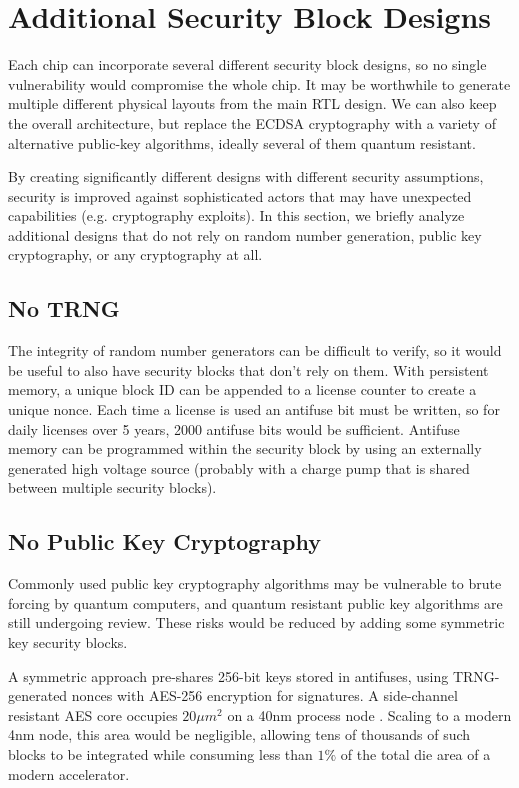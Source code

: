 \documentclass{article}
\begin{document}
\section{Additional Security Block Designs}
\label{sec:alternative_designs}

Each chip can incorporate several different security block designs, so no single vulnerability would compromise the whole chip. It may be worthwhile to generate multiple different physical layouts from the main RTL design. We can also keep the overall architecture, but replace the ECDSA cryptography with a variety of alternative public-key algorithms, ideally several of them quantum resistant.

By creating significantly different designs with different security assumptions, security is improved against sophisticated actors that may have unexpected capabilities (e.g. cryptography exploits). In this section, we briefly analyze additional designs that do not rely on random number generation, public key cryptography, or any cryptography at all.


\subsection{No TRNG}

The integrity of random number generators can be difficult to verify, so it would be useful to also have security blocks that don't rely on them. With persistent memory, a unique block ID can be appended to a license counter to create a unique nonce. Each time a license is used an antifuse bit must be written, so for daily licenses over 5 years, 2000 antifuse bits would be sufficient. Antifuse memory can be programmed within the security block by using an externally generated high voltage source (probably with a charge pump that is shared between multiple security blocks).

\subsection{No Public Key Cryptography}

Commonly used public key cryptography algorithms may be vulnerable to brute forcing by quantum computers, and quantum resistant public key algorithms are still undergoing review. These risks would be reduced by adding some symmetric key security blocks.

A symmetric approach pre-shares 256-bit keys stored in antifuses, using TRNG-generated nonces with AES-256 encryption for signatures. A side-channel resistant AES core occupies $20 \mu m^2$ on a 40nm process node \cite{zhang_compact_2018}. Scaling to a modern 4nm node, this area would be negligible, allowing tens of thousands of such blocks to be integrated while consuming less than $1\%$ of the total die area of a modern accelerator.
\end{document}
